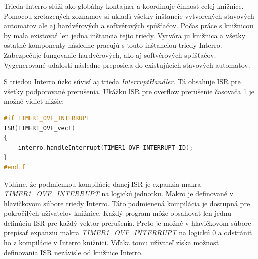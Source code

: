 Trieda Interro slúži ako globálny kontajner a koordinuje činnosť celej knižnice. Pomocou zreťazených zoznamov si ukladá všetky inštancie vytvorených stavových automatov
ale aj hardvérových a softvérových spúšťačov. Počas práce s knižnicou by mala existovať len jedna inštancia tejto triedy. Vytvára ju knižnica a všetky ostatné komponenty
následne pracujú s touto inštanciou triedy Interro. Zabezpečuje fungovanie hardvérových, ako aj softvérových spúšťačov. Vygenerované udalosti následne preposiela do
existujúcich stavových automatov. \par
S triedou Interro úzko súvisí aj trieda \textit{InterruptHandler}. Tá obsahuje ISR pre všetky podporované prerušenia. Ukážku ISR pre overflow prerušenie časovača 1
je možné vidieť nižšie:
\begin{lstlisting}[language=c++]  
#if TIMER1_OVF_INTERRUPT
ISR(TIMER1_OVF_vect)
{
    interro.handleInterrupt(TIMER1_OVF_INTERRUPT_ID);
}
#endif
\end{lstlisting}


Vidíme, že podmienkou kompilácie danej ISR je expanzia makra \textit{TIMER1\_OVF\_INTERRUPT} na logickú jednotku. Makro je definované v hlavičkovom súbore triedy Interro.
Táto podmienená kompilácia je dostupná pre pokročilých užívateľov knižnice. Každý program môže obsahovať len jednu definúciu ISR pre každý vektor prerušenia. Preto je
možné v hlavičkovom súbore prepísať expanziu makra \textit{TIMER1\_OVF\_INTERRUPT} na logickú 0 a odstrániť ho z kompilácie v Interro knižnici. Vďaka tomu užívateľ získa
možnosť definovania ISR nezávisle od knižnice Interro.
